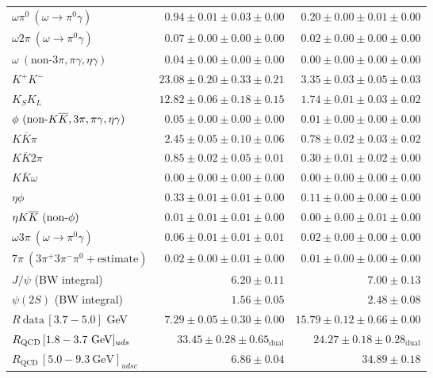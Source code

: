 \begin{table*}[p]
\begin{tabularx}{\textwidth}{@{\extracolsep{\fill}}lrr}
$\omega\pi^0~(\omega\rightarrow\pi^0\gamma)$ &$  0.94 \pm 0.01 \pm 0.03 \pm 0.00$&$  0.20 \pm 0.00 \pm 0.01 \pm 0.00$\\
$\omega2\pi~(\omega\rightarrow\pi^0\gamma)$ &$  0.07 \pm 0.00 \pm 0.00 \pm 0.00$&$  0.02 \pm 0.00 \pm 0.00 \pm 0.00$\\
$\omega~(\textrm{non-}3\pi,\pi\gamma,\eta\gamma)$ &$  0.04 \pm 0.00 \pm 0.00 \pm 0.00$&$  0.00 \pm 0.00 \pm 0.00 \pm 0.00$\\
$K^+K^-$ &$ 23.08 \pm 0.20 \pm 0.33 \pm 0.21$&$  3.35 \pm 0.03 \pm 0.05 \pm 0.03$\\
$K_SK_L$ &$ 12.82 \pm 0.06 \pm 0.18 \pm 0.15$&$  1.74 \pm 0.01 \pm 0.03 \pm 0.02$\\
$\phi~(\textrm{non-}K\overline{K},3\pi,\pi\gamma,\eta\gamma)$ &$  0.05 \pm 0.00 \pm 0.00 \pm 0.00$&$  0.01 \pm 0.00 \pm 0.00 \pm 0.00$\\
$K\overline{K}\pi$ &$  2.45 \pm 0.05 \pm 0.10 \pm 0.06$&$ 0.78 \pm 0.02 \pm 0.03 \pm 0.02$\\
$K\overline{K}2\pi$ &$  0.85 \pm 0.02 \pm 0.05 \pm 0.01$&$ 0.30 \pm 0.01 \pm 0.02 \pm 0.00$\\
$K\overline{K}\omega$ &$ 0.00 \pm 0.00 \pm 0.00 \pm 0.00$&$ 0.00 \pm 0.00 \pm 0.00 \pm 0.00$\\
$\eta\phi$ &$  0.33 \pm 0.01 \pm 0.01 \pm 0.00$&$  0.11 \pm 0.00 \pm 0.00 \pm 0.00$\\
$\eta K\overline{K}~(\textrm{non-}\phi)$ &$  0.01 \pm 0.01 \pm 0.01 \pm 0.00$&$  0.00 \pm 0.00 \pm 0.01 \pm 0.00$\\
$\omega3\pi~(\omega\rightarrow\pi^0\gamma)$ &$  0.06 \pm 0.01 \pm 0.01 \pm 0.01$&$  0.02 \pm 0.00 \pm 0.00 \pm 0.00$\\
$7\pi~(3\pi^+3\pi^-\pi^0+\textrm{estimate})$ &$  0.02 \pm 0.00 \pm 0.01 \pm 0.00$&$  0.01 \pm 0.00 \pm 0.00 \pm 0.00$\\
\noalign{\smallskip}\hline\noalign{\smallskip}
$J/\psi$ (BW integral) &$  6.20 \pm 0.11$&$  7.00 \pm 0.13$\\
$\psi(2S)$ (BW integral) &$  1.56 \pm 0.05$&$  2.48 \pm 0.08$\\
\noalign{\smallskip}\hline\noalign{\smallskip}
$R~\textrm{data}\,[3.7-5.0]$ GeV &$  7.29 \pm 0.05 \pm 0.30 \pm 0.00$&$ 15.79 \pm 0.12 \pm 0.66 \pm 0.00$\\
\noalign{\smallskip}\hline\noalign{\smallskip}
$R_\textrm{QCD}\,[1.8-3.7~\textrm{\rm GeV}]_{uds}$ &$ 33.45 \pm 0.28 \pm 0.65_\textrm{dual}$&$ 24.27 \pm 0.18 \pm 0.28_\textrm{dual}$\\
$R_\textrm{QCD}\,[5.0-9.3~\textrm{GeV}]_{udsc}$ &$  6.86 \pm 0.04$&$ 34.89 \pm 0.18$\\

\end{tabularx}
\end{table*}
